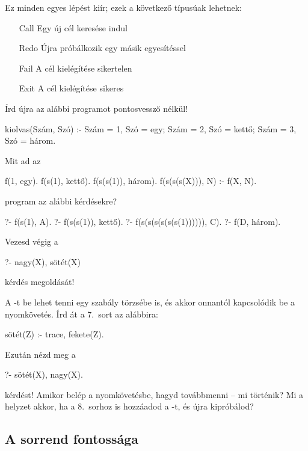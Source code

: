 Ez minden egyes lépést kiír; ezek a következő
típusúak lehetnek:
\begin{itemize}
\item [Call] Egy új cél keresése indul
\item [Redo] Újra próbálkozik egy másik egyesítéssel
\item [Fail] A cél kielégítése sikertelen
\item [Exit] A cél kielégítése sikeres
\end{itemize}

\begin{problem}
Írd újra az alábbi programot pontosvessző nélkül!
\begin{program}
kiolvas(Szám, Szó) :-
    Szám = 1, Szó = egy;
    Szám = 2, Szó = kettő;
    Szám = 3, Szó = három.
\end{program}
\end{problem}
\begin{problem}
Mit ad az
\begin{program}
f(1, egy).
f(s(1), kettő).
f(s(s(1)), három).
f(s(s(s(X))), N) :- f(X, N).
\end{program}       
program az alábbi kérdésekre?
\begin{query}
?- f(s(1), A).
?- f(s(s(1)), kettő).
?- f(s(s(s(s(s(s(1)))))), C).
?- f(D, három).
\end{query}
\end{problem}
\begin{problem}
Vezesd végig a
\begin{query}
?- nagy(X), sötét(X)
\end{query}
kérdés megoldását!
\end{problem}
\begin{problem}
A -t be lehet tenni egy szabály törzsébe
is, és akkor onnantól kapcsolódik be a
nyomkövetés. Írd át a 7.~sort az alábbira:
\begin{program}
sötét(Z) :- trace, fekete(Z).
\end{program}
Ezután nézd meg a
\begin{query}
?- sötét(X), nagy(X).
\end{query}
kérdést! Amikor belép a nyomkövetésbe, hagyd
továbbmenni -- mi történik? Mi a helyzet akkor, ha a
8.~sorhoz is hozzáadod a -t, és újra
kipróbálod?
\end{problem}

\subsection*{A sorrend fontossága}

